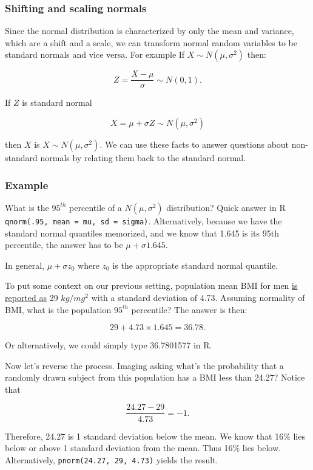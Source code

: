 \documentclass[]{article}
\begin{document}
\subsubsection{Shifting and scaling
normals}\label{shifting-and-scaling-normals}

Since the normal distribution is characterized by only the mean and
variance, which are a shift and a scale, we can transform normal random
variables to be standard normals and vice versa. For example If
$X \sim N(\mu,\sigma^2)$ then:

\[Z = \frac{X -\mu}{\sigma} \sim N(0, 1).\]

If $Z$ is standard normal

\[X = \mu + \sigma Z \sim N(\mu, \sigma^2)\]

then $X$ is $X \sim N(\mu,\sigma^2)$. We can use these facts to answer
questions about non-standard normals by relating them back to the
standard normal.

\subsubsection{Example}\label{example-11}

What is the $95^{th}$ percentile of a $N(\mu, \sigma^2)$ distribution?
Quick answer in R \texttt{qnorm(.95, mean = mu, sd = sigma)}.
Alternatively, because we have the standard normal quantiles memorized,
and we know that 1.645 is its 95th percentile, the answer has to be
$\mu + \sigma 1.645$.

In general, $\mu + \sigma z_0$ where $z_0$ is the appropriate standard
normal quantile.

To put some context on our previous setting, population mean BMI for men
\href{http://www.ncbi.nlm.nih.gov/pubmed/23675464}{is reported as} 29
$kg/mg^2$ with a standard deviation of 4.73. Assuming normality of BMI,
what is the population $95^{th}$ percentile? The answer is then:

\[
29 + 4.73 \times 1.645 = 36.78.
\]

Or alternatively, we could simply type 36.7801577 in R.

Now let's reverse the process. Imaging asking what's the probability
that a randomly drawn subject from this population has a BMI less than
24.27? Notice that

\[
\frac{24.27 - 29}{4.73} = -1.
\]

Therefore, 24.27 is 1 standard deviation below the mean. We know that
16\% lies below or above 1 standard deviation from the mean. Thus 16\%
lies below. Alternatively, \texttt{pnorm(24.27, 29, 4.73)} yields the
result.
\end{document}
